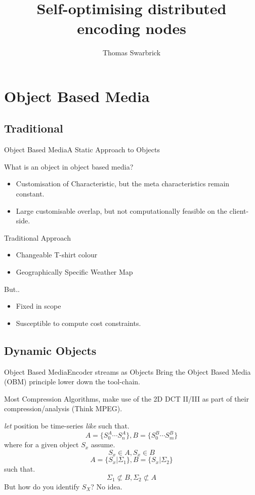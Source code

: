 \documentclass{beamer}
\title{Self-optimising distributed encoding nodes}
\author{Thomas Swarbrick}
\begin{document}
\maketitle
\section{Object Based Media}
\subsection{Traditional}
\begin{frame}[t]{Object Based Media}{A Static Approach to Objects}
  \begin{alertblock}{What is an object in object based media?}
    \begin{itemize}
\item Customisation of Characteristic, but the meta characteristics remain constant.
      \item Large customisable overlap, but not computationally feasible on the client-side.
    \end{itemize}

  \end{alertblock}
  \pause
  \begin{exampleblock}{Traditional Approach}
    \begin{itemize}
\item Changeable T-shirt colour
\item Geographically Specific Weather Map
    \end{itemize}

  \end{exampleblock}
  But..
  \pause
    \begin{itemize}
\item Fixed in scope
      \item Susceptible to compute cost constraints.
    \end{itemize}
    \pause

\end{frame}
  \subsection{Dynamic Objects}
  \begin{frame}[t]{Object Based Media}{Encoder streams as Objects}
    Bring the Object Based Media (OBM) principle lower down the tool-chain.

    Most Compression Algorithms, make use of the 2D DCT II/III as part of their compression/analysis (Think MPEG).
\pause
    \begin{theorem}
      \emph{let} position be time-series \emph{like} such that.
      \[A = \{S^{A}_{0}\cdots S^{A}_{n}\}, B = \{S^{B}_{0}\cdots S^{B}_{m}\}\]
      where for a given object $S_{x}$ assume. \[ S_{x} \in A, S_{x} \in B\]
      \[  A =\{S_{x} | \Sigma_{1} \}, B = \{S_{x} | \Sigma_{2}\}\]
      such that.
      \[\Sigma_{1} \not\subset B, \Sigma_{2} \not\subset A\]
      \pause
     But how do you identify $S_{X}$? No idea.
    \end{theorem}
  \end{frame}
\end{document}
